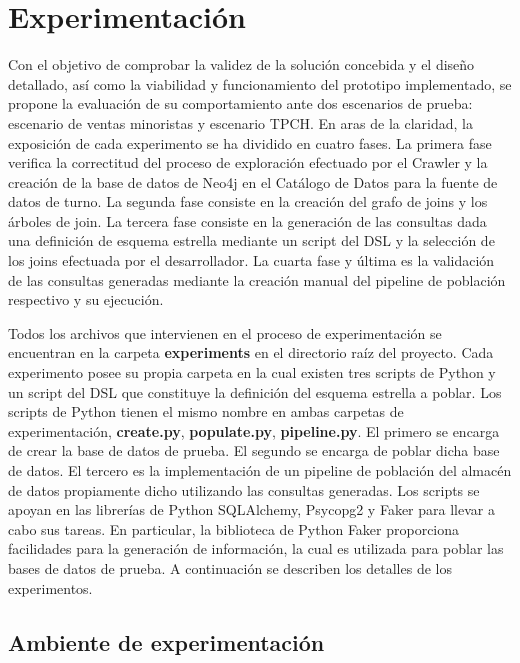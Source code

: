 \section{Experimentación} \label{section:Experimentation}

Con el objetivo de comprobar la validez de la solución concebida y el diseño detallado, así como 
la viabilidad y funcionamiento del prototipo implementado, se propone la evaluación 
de su comportamiento ante dos escenarios de prueba: escenario de ventas minoristas y escenario TPCH. En aras de 
la claridad, la exposición de cada experimento se ha dividido en cuatro fases. La primera fase verifica 
la correctitud del proceso de exploración efectuado por el Crawler y la creación de la base de datos de Neo4j en el  
Catálogo de Datos para la fuente de datos de turno. La segunda fase consiste en la creación 
del grafo de joins y los \'arboles de join. La tercera fase consiste en la generación de las consultas dada una 
definición de esquema 
estrella mediante un script del DSL y la selección de los joins efectuada por el desarrollador. La cuarta fase y \'ultima 
es la validación de las consultas generadas 
mediante la creación manual del pipeline de población respectivo y su ejecución. 

Todos los archivos que intervienen 
en el proceso de experimentación se encuentran en la carpeta \textbf{experiments} en el directorio raíz del proyecto. 
Cada experimento posee su propia carpeta en la cual existen tres scripts de Python y un script del DSL que constituye 
la definición del esquema estrella a poblar. Los scripts de Python tienen el mismo nombre en ambas carpetas de experimentación, 
\textbf{create.py}, \textbf{populate.py}, \textbf{pipeline.py}. El primero se encarga de 
crear la base de datos de prueba. El segundo se 
encarga de poblar dicha base de datos. El tercero es la implementación de un pipeline de población del almacén de 
datos propiamente dicho utilizando 
las consultas generadas. Los scripts se apoyan en las librerías de Python SQLAlchemy, Psycopg2 y Faker para llevar a 
cabo sus tareas. En particular, la biblioteca de Python Faker proporciona facilidades para la generación de información, 
la cual es utilizada para poblar las bases de datos de prueba. A continuación se describen 
los detalles de los experimentos.

\subsection{Ambiente de experimentación}

